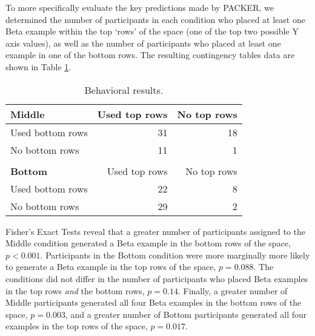 \documentclass[10pt,letterpaper]{article}
\begin{document}
To more specifically evaluate the key predictions made by PACKER, we determined the number of participants in each condition who placed at least one Beta example within the top `rows' of the space (one of the top two possible Y axis values), as well as the number of participants who placed at least one example in one of the bottom rows. The resulting contingency tables data are shown in Table \ref{table:subset-table}.

\begin{table}
\begin{center} 
\caption{Behavioral results.} 
\label{table:subset-table} 
\vskip 0.12in
\begin{tabular}{ l r r}
    \textbf{Middle}         & Used top rows & No top rows \\
    \hline
    Used bottom rows        &  31 & 18  \\
    No bottom rows          &  11 &  1  \\
    \\
    \textbf{Bottom}         & Used top rows & No top rows \\
    \hline
    Used bottom rows        & 22 & 8 \\
    No bottom rows          & 29 & 2 \\
\end{tabular}
\end{center} 
\end{table}


Fisher's Exact Tests reveal that a greater number of participants assigned to the Middle condition generated a Beta example in the bottom rows of the space, $p < 0.001$. Participants in the Bottom condition were more marginally more likely to generate a Beta example in the top rows of the space, $p = 0.088$. The conditions did not differ in the number of participants who placed Beta examples in the top rows \textit{and} the bottom rows, $p = 0.14$. Finally, a greater number of Middle participants generated all four Beta examples in the bottom rows of the space, $p = 0.003$, and a greater number of Bottom participants generated all four examples in the top rows of the space, $p = 0.017$. 
\end{document}

